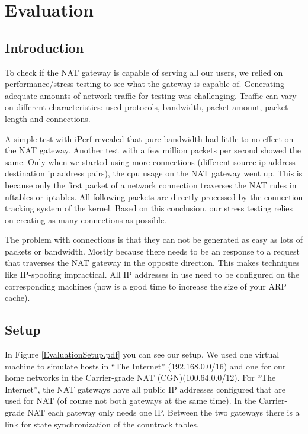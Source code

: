 \documentclass{report}
\begin{document}
\chapter{Evaluation}\label{evaluation}

\section{Introduction}\label{introduction-1}

To check if the NAT gateway is capable of serving all our users, we
relied on performance/stress testing to see what the gateway is capable
of. Generating adequate amounts of network traffic for testing was challenging.
Traffic can vary on different characteristics: used protocols, bandwidth, packet amount,
packet length and connections.

A simple test with iPerf\cite{iperf} revealed that pure bandwidth had little
to no effect on the NAT gateway. Another test with a few million
packets per second showed the same. Only when we started using more
connections (different source ip address destination ip address pairs), the cpu usage on
the NAT gateway went up. This is because only the first packet of a
network connection traverses the NAT rules in nftables or iptables. All
following packets are directly processed by the connection tracking
system of the kernel. Based on this conclusion, our stress testing relies on creating
as many connections as possible.

The problem with connections is that they can not be generated as easy as
lots of packets or bandwidth. Mostly because there needs to be an
response to a request that traverses the NAT gateway in the opposite
direction. This makes techniques like IP-spoofing impractical. All
IP addresses in use need to be configured on the corresponding machines (now is
a good time to increase the size of your ARP cache).

\section{Setup}\label{setup-1}

In Figure \ref{EvaluationSetup.pdf} you can see our setup. We used one virtual machine to simulate
hosts in ``The Internet'' (192.168.0.0/16) and one for our home networks
in the Carrier-grade NAT (CGN)(100.64.0.0/12). For ``The Internet'', the
NAT gateways have all public IP addresses configured that are used for
NAT (of course not both gateways at the same time). In the Carrier-grade
NAT each gateway only needs one IP. Between the two gateways there is a
link for state synchronization of the conntrack tables.
\end{document}
